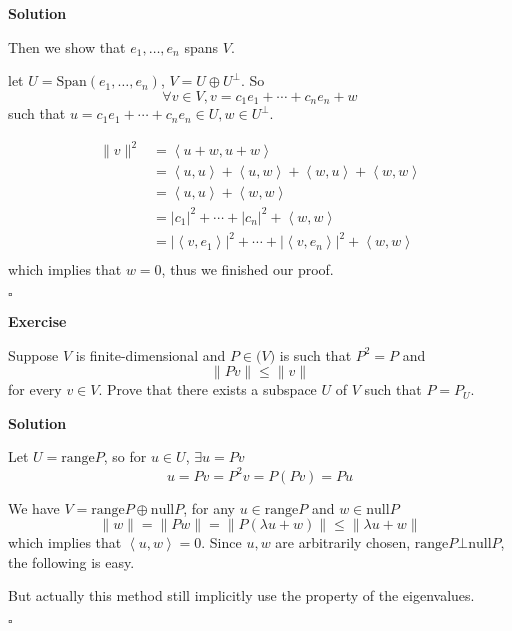 \documentclass{article}
\newenvironment{exercise}{%
{\textbf{Exercise\\}
    }
}{
}
\newenvironment{solution}{%
{
    \textbf{Solution\\}
    }
}{
  \hfill $\square$ 
  \par\bigskip 
}
\newcommand{\spans}{\text{Span}}
\newcommand{\range}{\text{range}}
\newcommand{\n}{\text{null}}
\begin{document}
\begin{CJK}{UTF8}{gkai}
\begin{solution}
    Then we show that $e_1,\ldots,e_n$ spans $V$.

    let $U = \spans(e_1,\ldots,e_n)$, $V = U \oplus U^\bot$. So 
    \[\forall v \in V, v = c_1 e_1 + \cdots + c_n e_n + w\] 
    such that $u = c_1 e_1 + \cdots + c_n e_n \in U, w \in U^\bot$.

    \[
    \begin{aligned}
        \|v\|^2 &= \left<u + w,u + w\right> \\
        &= \left<u,u\right>+\left<u,w\right> + \left< w, u\right> + \left< w, w\right> \\
        &= \left<u,u\right> + \left< w, w\right>\\
        &= |c_1|^2 + \cdots + |c_n|^2 + \left< w, w\right>\\
        &= |\left<v,e_1\right>|^2 + \cdots + |\left<v,e_n\right>|^2 + \left< w, w\right>\\
    \end{aligned}    
    \]
    which implies that $w = 0$, thus we finished our proof.

\end{solution}

\begin{exercise}
    Suppose $V$ is finite-dimensional and $P \in \mathcal(V)$ is such that $P^2 = P$ and
    \[\|Pv\| \leq \|v\|\]
    for every $v \in V$. Prove that there exists a subspace $U$ of $V$ such that $P = P_U$.
\end{exercise}

\begin{solution}

    Let $U = \range P$, so for $u \in U$, $\exists u = Pv$
    \[u = Pv = P^2 v = P(Pv) = Pu \]

    We have $V = \range P \oplus \n P$, for any $u \in \range P$ and $w \in \n P$ \[\|w\| = \|Pw\| = \|P(\lambda u + w)\| \leq \|\lambda u + w\|\]
    which implies that $\left<u,w\right> = 0$. Since $u,w$ are arbitrarily chosen, $\range P \bot \n P$, the following is easy.

    But actually this method still implicitly use the property of the eigenvalues.
\end{solution}


\end{CJK}
\end{document}
